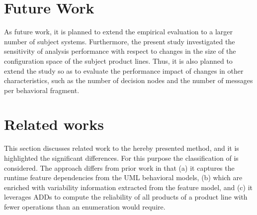\section{Future Work \label{sec:futureWork}}


As future work, it is planned to extend the empirical evaluation to a larger number of
subject systems.  Furthermore, the present study investigated the sensitivity of
analysis performance with respect to changes in the size of the configuration
space of the subject product lines.  Thus, it is also planned to extend the study so
as to evaluate the performance impact of changes in other characteristics, such
as the number of decision nodes and the number of messages per behavioral
fragment.











\section{Related works \label{sec:relatedworks}}


This section discusses related work to the hereby presented method, and it is highlighted the
significant differences. For this purpose the classification of
\citet{thum_classification_2014} is considered. The approach differs from prior work
\cite{classen_featured_2013, ghezzi_model-based_2013, rodrigues_modeling_2015}
in that (a) it captures the runtime feature dependencies from the UML behavioral
models, (b) which are enriched with variability information extracted from the
feature model, and (c) it leverages ADDs to compute the reliability of all
products of a product line with fewer operations than an enumeration would
require.


